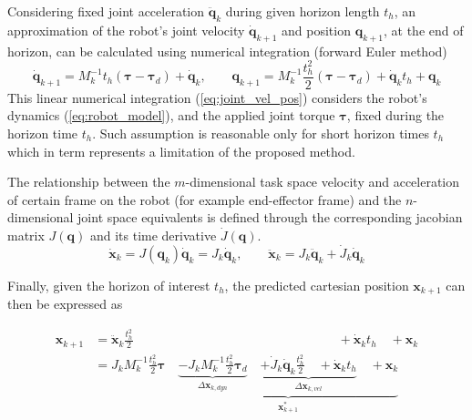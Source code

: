 Considering fixed joint acceleration $\ddot{\bm{q}}_{k}$ during given horizon length $t_h$, an approximation of the robot's joint velocity $\dot{\bm{q}}_{k+1}$ and position $\bm{q}_{k+1}$, at the end of horizon, can be calculated using numerical integration (forward Euler method) 
\begin{equation}
    \dot{\bm{q}}_{k+1} = M_k^{-1}t_h(\bm{\tau} - \bm{\tau}_d) + \dot{\bm{q}}_{k}, \qquad \bm{q}_{k+1} = M_k^{-1}\frac{t_h^2}{2}(\bm{\tau} - \bm{\tau}_d) + \dot{\bm{q}}_{k}t_h + \bm{q}_{k}
    \label{eq:joint_vel_pos}
\end{equation}
This linear numerical integration (\ref{eq:joint_vel_pos}) considers the robot's dynamics (\ref{eq:robot_model}), and the applied joint torque $\bm{\tau}$, fixed during the horizon time $t_h$. Such assumption is reasonable only for short horizon times $t_h$ which in term represents a limitation of the proposed method.

The relationship between the $m$-dimensional task space velocity and acceleration of certain frame on the robot (for example end-effector frame) and the $n$-dimensional joint space equivalents is defined through the corresponding jacobian matrix $J(\bm{q})$ and its time derivative $\dot{J}(\bm{q})$. 
\begin{equation}
    \dot{\bm{x}}_k = J(\bm{q}_k)\dot{\bm{q}}_k = J_k \dot{\bm{q}}_k, \qquad  \ddot{\bm{x}}_k = J_k \ddot{\bm{q}}_k + \dot{J}_k \dot{\bm{q}}_k
\end{equation}

Finally, given the horizon of interest $t_h$, the predicted cartesian position $\bm{x}_{k+1}$ can then be expressed as

\begin{equation}
\begin{split}
    {\bm{x}}_{k+1} &= \ddot{\bm{x}}_k\frac{t_h^2}{2}   \qquad\qquad\qquad\qquad\qquad\qquad\qquad\qquad+\dot{\bm{x}}_kt_h \quad +\!  \bm{x}_k\\
    &=  J_k M_k^{-1}\frac{t_h^2}{2}\bm{\tau} \quad \underbrace{\underbrace{-
    J_k M_k^{-1}\frac{t_h^2}{2}\bm{\tau}_d}_{\Delta \bm{x}_{k,dyn}}  \quad \underbrace{ +\dot{J}_k \dot{\bm{q}}_k\frac{t_h^2}{2} \quad+ \dot{\bm{x}}_kt_h}_{\Delta \bm{x}_{k,vel}} \quad + \bm{x}_{k} }_{\bm{x}^*_{k+1}}
    \end{split}
    \label{eq:pred_pos}
\end{equation}

